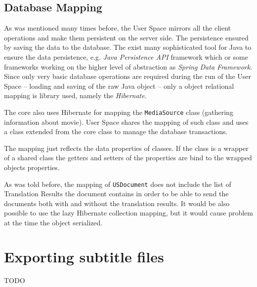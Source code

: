 \subsection{Database Mapping}

As was mentioned many times before, the User Space mirrors all the client operations and make them persistent on the server side. The persistence ensured by saving the data to the database. The exist many sophisticated tool for Java to ensure the data persistence, e.g. \emph{Java Persistence API} framework which or some frameworks working on the higher level of abstraction as \emph{Spring Data Framework}. Since only very basic database operations are required during the run of the User Space -- loading and saving of the raw Java object -- only a object relational mapping is library used, namely the \emph{Hibernate}.

The core also uses Hibernate for mapping the {\tt MediaSource} class (gathering information about movie). User Space shares the mapping of such class and uses a class extended from the core class to manage the database transactions.

The mapping just reflects the data properties of classes. If the class is a wrapper of a shared class the getters and setters of the properties are bind to the wrapped objects properties.

As was told before, the mapping of {\tt USDocument} does not include the list of Translation Results the document contains in order to be able to send the documents both with and without the translation results. It would be also possible to use the lazy Hibernate collection mapping, but it would cause problem at the time the object serialized.

\section{Exporting subtitle files}
\label{sec:export}

TODO 

